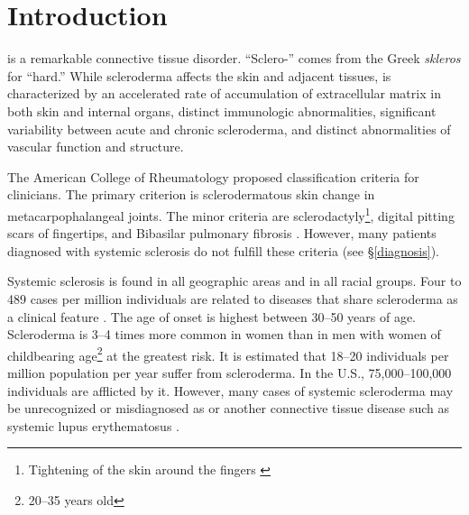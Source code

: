 \section{Introduction}

\SSc is a remarkable connective tissue disorder. ``Sclero-'' comes from the
Greek \emph{skleros} for ``hard.'' While scleroderma affects the skin and
adjacent tissues, \ssc is characterized by an accelerated rate of accumulation
of extracellular matrix in both skin and internal organs, distinct immunologic
abnormalities, significant variability between acute and chronic scleroderma,
and distinct abnormalities of vascular function and structure.

The American College of Rheumatology proposed \ssc classification criteria for
clinicians. The primary criterion is sclerodermatous skin change in
metacarpophalangeal joints. The minor criteria are sclerodactyly\footnote{
Tightening of the skin around the fingers \citep{dfnsclerodactyly}}, digital
pitting scars of fingertips, and Bibasilar pulmonary fibrosis
\citep[1211]{kelley}. However, many patients diagnosed with systemic sclerosis
do not fulfill these criteria (see \S\ref{diagnosis}).

Systemic sclerosis is found in all geographic areas and in all racial groups.
Four to 489 cases per million individuals are related to diseases that share
scleroderma as a clinical feature \citep{overviewSSc}. The age of onset is
highest between 30--50 years of age. Scleroderma is 3--4 times more common in
women than in men with women of childbearing age\footnote{20--35 years old} at
the greatest risk. It is estimated that 18--20 individuals per million
population per year suffer from scleroderma. In the U.S., 75,000--100,000
individuals are afflicted by it. However, many cases of systemic scleroderma
may be unrecognized or misdiagnosed as \Rp or another connective tissue
disease such as systemic lupus erythematosus \citep[1212]{kelley}.

